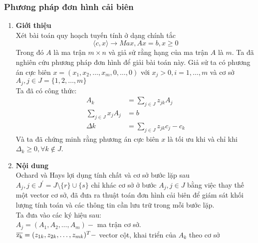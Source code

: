 \documentclass{article}
\begin{document}
            \subsubsection{Phương pháp đơn hình cải biên}
                \begin{enumerate}
                    \item \textbf{Giới thiệu} \\
                        Xét bài toán quy hoạch tuyến tính ở dạng chính tắc
                            \begin{equation}
                                \langle c,x \rangle \rightarrow Max , Ax = b, x\geq 0
                            \end{equation}
                        Trong đó $A$ là ma trận $m \times n$ và giả sử rằng hạng của ma trận $A$ là $m$. Ta đã nghiên cứu phương pháp đơn hình để giải bài toán này. Giả sử ta có phương án cực biên $x=(x_1,x_2,\ldots,x_m,0,\ldots,0)$ với $x_j>0,i=1,\ldots,m$ và cơ sở $A_j, j \in J=\{1,2,\ldots,m \}$ \\
                        Ta đã có công thức:
                            \begin{equation}
                                \begin{split}
                                    A_k&=\sum_{j\in J}z_{jk}A_j \\
                                    \sum_{j \in J}x_jA_j&=b \\
                                    \Delta k &= \sum_{j \in J}z_{jk}c_j-c_k
                                \end{split}
                            \end{equation}
                        Và ta đã chứng minh rằng phương án cực biên $x$ là tối ưu khi và chỉ khi $\Delta_k \geq 0, \forall k \notin J$.
                    \item \textbf{Nội dung} \\
                        Ochard và Hays lợi dụng tính chất và cơ sở bước lặp sau $A_j,j\in J^{'}=J \setminus \{r\} \cup \{s\}$ chỉ khác cơ sở ở bước $A_j,j \in J$ bằng việc thay thế một vector cơ sở, đã đưa ra thuật toán đơn hình cải biên để giám sát khối lượng tính toán và các thông tin cần lưu trữ trong mỗi bước lặp. \\
                        Ta đưa vào các ký hiệu sau: \\
                        $A_j=(A_1,A_2,\ldots,A_m)-$ ma trận cơ sở. \\
                        $\overline{\rm z_k} = (z_{1k},z_{2k},\ldots,z_{mk})^T-$ vector cột, khai triển của $A_k$ theo cơ sở \\

\end{enumerate}
\end{document}
